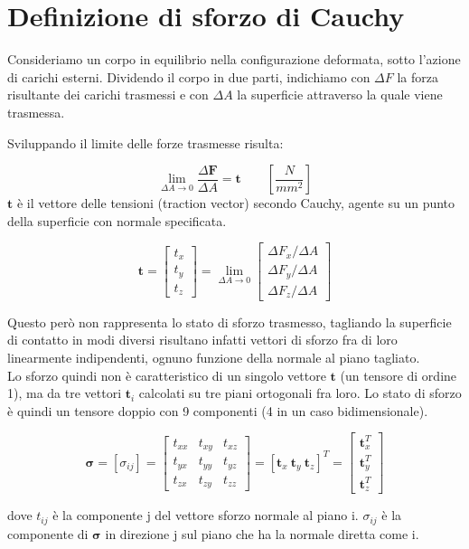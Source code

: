 \section{Definizione di sforzo di Cauchy}

Consideriamo un corpo in equilibrio nella configurazione deformata, sotto l'azione di carichi esterni. Dividendo il corpo in due parti, indichiamo con $\Delta F$ la forza risultante dei carichi trasmessi e con $\Delta A $ la superficie attraverso la quale viene trasmessa. 


Sviluppando il limite delle forze trasmesse risulta:

\begin{equation*}
 \lim_{\Delta A \to 0} \frac{\Delta \mathbf{F}}{\Delta A}   =\mathbf{t}             \quad\quad \left[ \frac{N}{mm^2} \right]
\end{equation*}
 $\mathbf{t}$ è il vettore delle tensioni (traction vector) secondo Cauchy, agente su un punto della superficie con normale specificata.

\begin{equation*}
\mathbf{t} = 
\begin{bmatrix}
t_x \\
t_y \\
t_z
\end{bmatrix}
=
\lim_{\Delta A \to 0} 
\begin{bmatrix}
\Delta F_x / \Delta A \\
\Delta F_y / \Delta A \\
\Delta F_z / \Delta A
\end{bmatrix}
\end{equation*}

Questo però non rappresenta lo stato di sforzo trasmesso, tagliando la superficie di contatto in modi diversi risultano infatti vettori di sforzo fra di loro linearmente indipendenti, ognuno funzione della normale al piano tagliato.\\
Lo sforzo quindi non è caratteristico di un singolo vettore $\mathbf{t}$ (un tensore di ordine 1),  ma da tre vettori $\mathbf{t}_i$ calcolati su tre piani ortogonali fra loro.
Lo stato di sforzo è quindi un tensore doppio con 9 componenti (4 in un caso bidimensionale).


\begin{equation*}
\boldsymbol{\sigma} 
= \left[ \sigma_{ij} \right] 
= \begin{bmatrix}
t_{xx} & t_{xy} & t_{xz} \\
t_{yx} & t_{yy} & t_{yz} \\
t_{zx} & t_{zy} & t_{zz}
\end{bmatrix}
= \left[ 
\mathbf{t}_x \ \mathbf{t}_y \ \mathbf{t}_z
\right]^T
=\begin{bmatrix}
\mathbf{t}_x^T \\
\mathbf{t}_y^T \\
\mathbf{t}_z^T
\end{bmatrix}
\end{equation*}

dove $t_{ij}$ è la componente j del vettore sforzo normale al piano i.
$\sigma_{ij}$ è la componente di $\boldsymbol{\sigma}$ in direzione j sul piano che ha la normale diretta come i.

